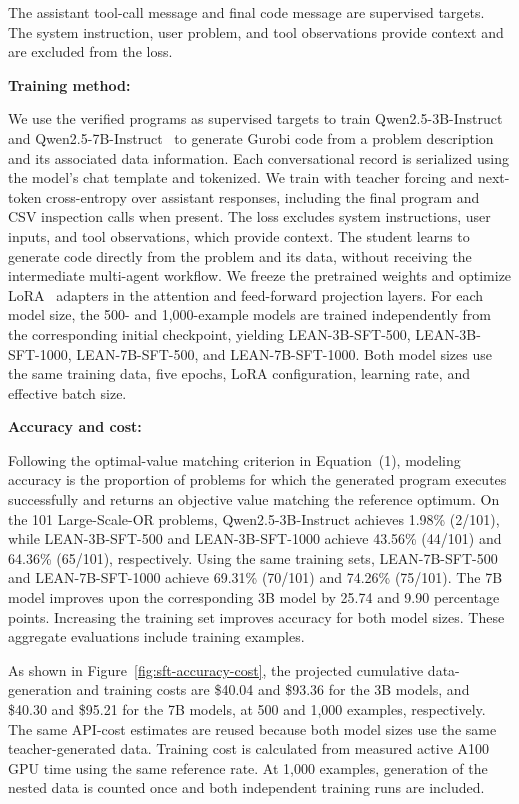 \documentclass[11pt]{article}
\begin{document}
\begin{enumerate}[label=(R2.Major.\arabic*),leftmargin=*]
The assistant tool-call message and final code message are supervised targets. The system instruction, user problem, and tool observations provide context and are excluded from the loss.

\medskip
\textbf{Training method:}

We use the verified programs as supervised targets to train Qwen2.5-3B-Instruct and Qwen2.5-7B-Instruct~\citep{yang2024qwen25} to generate Gurobi code from a problem description and its associated data information. Each conversational record is serialized using the model's chat template and tokenized. We train with teacher forcing and next-token cross-entropy over assistant responses, including the final program and CSV inspection calls when present. The loss excludes system instructions, user inputs, and tool observations, which provide context. The student learns to generate code directly from the problem and its data, without receiving the intermediate multi-agent workflow. We freeze the pretrained weights and optimize LoRA~\citep{hu2022lora} adapters in the attention and feed-forward projection layers. For each model size, the 500- and 1,000-example models are trained independently from the corresponding initial checkpoint, yielding LEAN-3B-SFT-500, LEAN-3B-SFT-1000, LEAN-7B-SFT-500, and LEAN-7B-SFT-1000. Both model sizes use the same training data, five epochs, LoRA configuration, learning rate, and effective batch size. 

\medskip
\textbf{Accuracy and cost:}

Following the optimal-value matching criterion in Equation~(1), modeling accuracy is the proportion of problems for which the generated program executes successfully and returns an objective value matching the reference optimum. On the 101 Large-Scale-OR problems, Qwen2.5-3B-Instruct achieves 1.98\% (2/101), while LEAN-3B-SFT-500 and LEAN-3B-SFT-1000 achieve 43.56\% (44/101) and 64.36\% (65/101), respectively. Using the same training sets, LEAN-7B-SFT-500 and LEAN-7B-SFT-1000 achieve 69.31\% (70/101) and 74.26\% (75/101). The 7B model improves upon the corresponding 3B model by 25.74 and 9.90 percentage points. Increasing the training set improves accuracy for both model sizes. These aggregate evaluations include training examples.

As shown in Figure~\ref{fig:sft-accuracy-cost}, the projected cumulative data-generation and training costs are \$40.04 and \$93.36 for the 3B models, and \$40.30 and \$95.21 for the 7B models, at 500 and 1,000 examples, respectively. The same API-cost estimates are reused because both model sizes use the same teacher-generated data. Training cost is calculated from measured active A100 GPU time using the same reference rate. At 1,000 examples, generation of the nested data is counted once and both independent training runs are included.


\end{enumerate}
\end{document}
